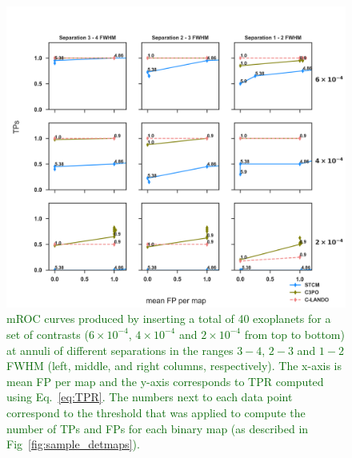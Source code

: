 \documentclass{aa}
\newcommand{\newchange}[1]{\textcolor{darkgreen}{#1}}
\begin{document}
\begin{figure}
\centering
    \includegraphics[width=1.0\textwidth]{fig4_Apr2024_referee.png}
\caption{ \newchange{mROC curves produced by inserting a total of 40 exoplanets for a set of contrasts ($6 \times 10^{-4}$, $4 \times 10^{-4}$ and $2 \times 10^{-4}$ from top to bottom) at annuli of different separations in the ranges $3-4$, $2-3$ and $1-2$ FWHM (left, middle, and right columns, respectively).
The x-axis is mean FP per map and the y-axis corresponds to TPR computed using Eq.~\ref{eq:TPR}. 
The numbers next to each data point correspond to the threshold that was applied to compute the number of TPs and FPs for each binary map (as described in Fig~\ref{fig:sample_detmaps}).
}}
    \label{fig:fig_4}
\end{figure}
\end{document}
